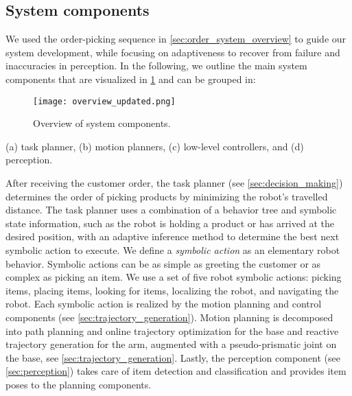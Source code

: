 \subsection{System components}

We used the order\hyp{}picking sequence in \cref{sec:order_system_overview} to guide our system development, while focusing on adaptiveness to recover from failure and inaccuracies in perception. 
In the following, we outline the main
system components that are visualized in \cref{fig:software_overview} and can be grouped in: 
\begin{figure}[t]
  \begin{center}
    \texttt{[image: overview\_updated.png]}
  \end{center}
  \caption{Overview of system components.}
  \label{fig:software_overview}
\end{figure}
(a) task planner, (b) motion planners, (c) low\hyp{}level controllers, and (d) perception.


After receiving the customer order, the task planner (see
\cref{sec:decision_making}) determines the order of picking
products by minimizing the robot's travelled distance. The
task planner uses a combination of a behavior tree and
symbolic state information, such as the robot is holding a
product or has arrived at the desired position,
with an adaptive inference method to determine the best next
symbolic action to execute.
We define a \textit{symbolic action} as an elementary robot
behavior. Symbolic actions can be as simple as greeting the
customer or as complex as picking an item.
We use a set of five robot
symbolic actions:
picking items, placing items, looking for items, localizing
the robot, and navigating the robot. Each symbolic action is realized
by the motion planning and control components (see
\cref{sec:trajectory_generation}). Motion planning is
decomposed into path planning and online trajectory
optimization for the base and reactive trajectory generation
for the arm, augmented with a pseudo\hyp{}prismatic joint on the
base, see \cref{sec:trajectory_generation}. Lastly, the
perception component (see \cref{sec:perception}) takes care
of item detection and classification and provides item poses
to the planning components.
